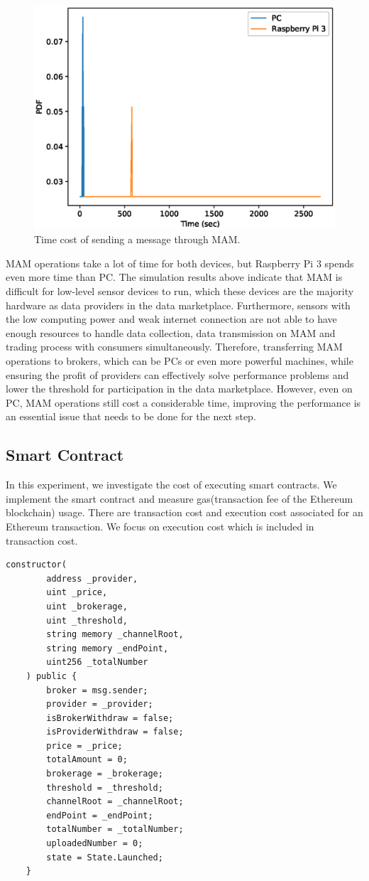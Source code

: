 \documentclass[journal,article,applsci,submit,moreauthors,pdftex]{Definitions/mdpi}
\begin{document}
\begin{figure}[H]
    \centering
    \includegraphics[width=3.3 in]{mam_send}
    \caption{Time cost of sending a message through MAM.}
    \label{fig:mam_send}
\end{figure}

MAM operations take a lot of time for both devices, but Raspberry Pi 3 spends even more time than PC. The simulation results above indicate that MAM is difficult for low-level sensor devices to run, which these devices are the majority hardware as data providers in the data marketplace. Furthermore, sensors with the low computing power and weak internet connection are not able to have enough resources to handle data collection, data transmission on MAM and trading process with consumers simultaneously. Therefore, transferring MAM operations to brokers, which can be PCs or even more powerful machines, while ensuring the profit of providers can effectively solve performance problems and lower the threshold for participation in the data marketplace. However, even on PC, MAM operations still cost a considerable time, improving the performance is an essential issue that needs to be done for the next step.  



\subsection{Smart Contract}

In this experiment, we investigate the cost of executing smart contracts. We implement the smart contract and measure gas(transaction fee of the Ethereum blockchain) usage. There are transaction cost and execution cost associated for an Ethereum transaction. We focus on execution cost which is included in transaction cost.

\begin{lstlisting}[caption={generate contract}, label={lst:constructor}, frame=single]
	constructor(
		address _provider,
		uint _price,
		uint _brokerage,
		uint _threshold,
		string memory _channelRoot,
		string memory _endPoint,
		uint256 _totalNumber
	) public {
		broker = msg.sender;
		provider = _provider;
		isBrokerWithdraw = false;
		isProviderWithdraw = false;
		price = _price;
		totalAmount = 0;
		brokerage = _brokerage;
		threshold = _threshold;
		channelRoot = _channelRoot;
		endPoint = _endPoint;
		totalNumber = _totalNumber;
		uploadedNumber = 0;
		state = State.Launched;
	}
\end{lstlisting}
\end{document}
